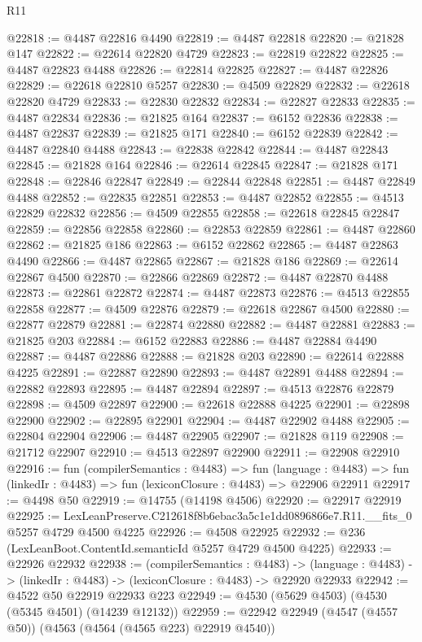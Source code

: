 \begin{lexlean}{R11}
\begin{coremodule}
@22818 := @4487 @22816 @4490
@22819 := @4487 @22818
@22820 := @21828 @147
@22822 := @22614 @22820 @4729
@22823 := @22819 @22822
@22825 := @4487 @22823 @4488
@22826 := @22814 @22825
@22827 := @4487 @22826
@22829 := @22618 @22810 @5257
@22830 := @4509 @22829
@22832 := @22618 @22820 @4729
@22833 := @22830 @22832
@22834 := @22827 @22833
@22835 := @4487 @22834
@22836 := @21825 @164
@22837 := @6152 @22836
@22838 := @4487 @22837
@22839 := @21825 @171
@22840 := @6152 @22839
@22842 := @4487 @22840 @4488
@22843 := @22838 @22842
@22844 := @4487 @22843
@22845 := @21828 @164
@22846 := @22614 @22845
@22847 := @21828 @171
@22848 := @22846 @22847
@22849 := @22844 @22848
@22851 := @4487 @22849 @4488
@22852 := @22835 @22851
@22853 := @4487 @22852
@22855 := @4513 @22829 @22832
@22856 := @4509 @22855
@22858 := @22618 @22845 @22847
@22859 := @22856 @22858
@22860 := @22853 @22859
@22861 := @4487 @22860
@22862 := @21825 @186
@22863 := @6152 @22862
@22865 := @4487 @22863 @4490
@22866 := @4487 @22865
@22867 := @21828 @186
@22869 := @22614 @22867 @4500
@22870 := @22866 @22869
@22872 := @4487 @22870 @4488
@22873 := @22861 @22872
@22874 := @4487 @22873
@22876 := @4513 @22855 @22858
@22877 := @4509 @22876
@22879 := @22618 @22867 @4500
@22880 := @22877 @22879
@22881 := @22874 @22880
@22882 := @4487 @22881
@22883 := @21825 @203
@22884 := @6152 @22883
@22886 := @4487 @22884 @4490
@22887 := @4487 @22886
@22888 := @21828 @203
@22890 := @22614 @22888 @4225
@22891 := @22887 @22890
@22893 := @4487 @22891 @4488
@22894 := @22882 @22893
@22895 := @4487 @22894
@22897 := @4513 @22876 @22879
@22898 := @4509 @22897
@22900 := @22618 @22888 @4225
@22901 := @22898 @22900
@22902 := @22895 @22901
@22904 := @4487 @22902 @4488
@22905 := @22804 @22904
@22906 := @4487 @22905
@22907 := @21828 @119
@22908 := @21712 @22907
@22910 := @4513 @22897 @22900
@22911 := @22908 @22910
@22916 := fun (compilerSemantics : @4483) =>
  fun (language : @4483) => fun (linkedIr : @4483) => fun (lexiconClosure : @4483) => @22906 @22911
@22917 := @4498 @50
@22919 := @14755 (@14198 @4506)
@22920 := @22917 @22919
@22925 := LexLeanPreserve.C212618f8b6ebac3a5c1e1dd0896866e7.R11.__fits_0 @5257 @4729 @4500 @4225
@22926 := @4508 @22925
@22932 := @236 (LexLeanBoot.ContentId.semanticId @5257 @4729 @4500 @4225)
@22933 := @22926 @22932
@22938 := (compilerSemantics : @4483) ->
  (language : @4483) -> (linkedIr : @4483) -> (lexiconClosure : @4483) -> @22920 @22933
@22942 := @4522 @50 @22919 @22933 @223
@22949 := @4530 (@5629 @4503) (@4530 (@5345 @4501) (@14239 @12132))
@22959 := @22942 @22949 (@4547 (@4557 @50)) (@4563 (@4564 (@4565 @223) @22919 @4540))

\end{coremodule}
\end{lexlean}
